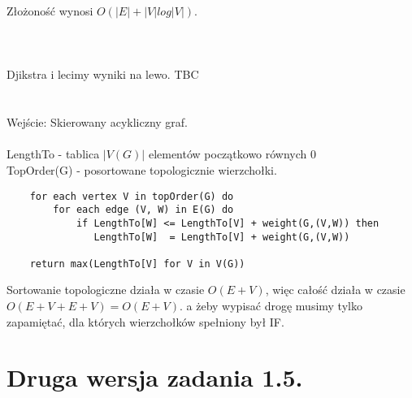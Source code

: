 \documentclass[svgnames]{report}
\begin{document}
Złożoność wynosi $O(|E| + |V| log |V|)$.
\section{}%
\\
Djikstra i lecimy wyniki na lewo. TBC
\section{}%
Wejście: Skierowany acykliczny graf.\\
\\
LengthTo - tablica $|V(G)|$ elementów początkowo równych 0\\
TopOrder(G) - posortowane topologicznie wierzchołki.\\


\begin{lstlisting}
    for each vertex V in topOrder(G) do
        for each edge (V, W) in E(G) do
            if LengthTo[W] <= LengthTo[V] + weight(G,(V,W)) then
               LengthTo[W]  = LengthTo[V] + weight(G,(V,W))
 
    return max(LengthTo[V] for V in V(G))
\end{lstlisting}

Sortowanie topologiczne działa w czasie $O(E+V)$,
więc całość działa w czasie $O(E+V+E+V) = O(E+V)$.
a żeby wypisać drogę musimy tylko zapamiętać, dla których wierzchołków spełniony był IF.

\section{}%
\section{Druga wersja zadania 1.5.}%
\end{document}
